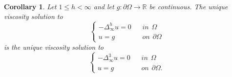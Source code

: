 \documentclass[12pt]{amsart}
\newtheorem{corollary}[thm]{Corollary}
\theoremstyle{definition}
\theoremstyle{remark}
\numberwithin{equation}{section}
\begin{document}
\begin{corollary}\label{threeisone}
Let $1\leq h< \infty$ and let $g:\partial \Omega \to \mathbb{R}$ be continuous. The unique viscosity solution to 
\begin{equation*}
\left\{ \begin{array}{cl}
-\Delta^h_\infty u =0 & \hspace{10pt} in \hspace{5pt} \Omega \\ 
u=g & \hspace{10pt} on \hspace{5pt} \partial \Omega 
\end{array}\right.
\end{equation*}
is the unique viscosity solution to 
\begin{equation*}
\left\{ \begin{array}{cl}
-\Delta^3_\infty u =0 & \hspace{10pt} in \hspace{5pt} \Omega \\ 
u=g & \hspace{10pt} on \hspace{5pt} \partial \Omega. 
\end{array}\right.
\end{equation*}
\end{corollary}
\end{document}
